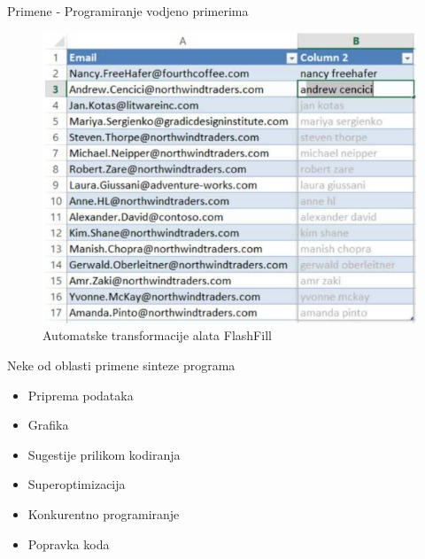 \begin{frame}{Primene - Programiranje vodjeno primerima}
    \begin{figure}
        \begin{center}
            \includegraphics[scale=0.6]{../resources/PBE.PNG}
        \end{center}
        \caption{Automatske transformacije alata FlashFill}
    \end{figure}
\end{frame}

\begin{frame}{Neke od oblasti primene sinteze programa}
    \begin{itemize}
        \item Priprema podataka
        \item Grafika
        \item Sugestije prilikom kodiranja
        \item Superoptimizacija
        \item Konkurentno programiranje
        \item Popravka koda
    \end{itemize}
\end{frame}

